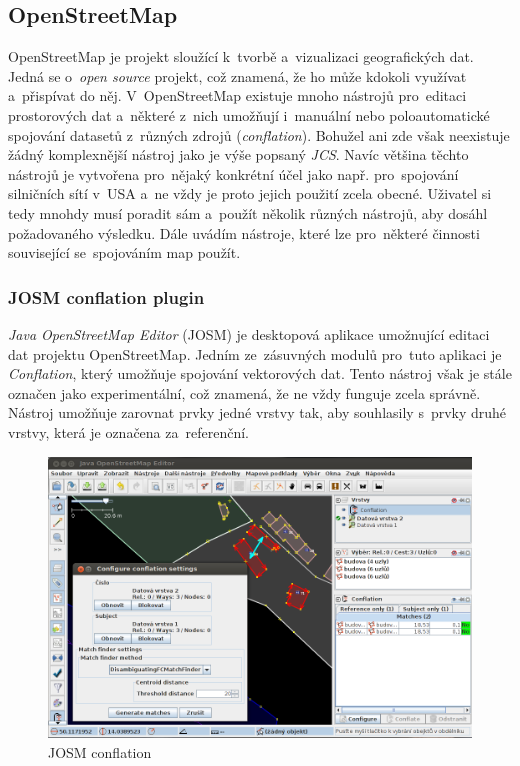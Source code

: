 
\subsection{OpenStreetMap}
\label{OSM}

OpenStreetMap je projekt sloužící k~tvorbě a~vizualizaci geografických dat.
Jedná se o~\textit{open source} projekt, což znamená, že ho může kdokoli 
využívat a~přispívat do něj. V~OpenStreetMap existuje mnoho nástrojů 
pro~editaci prostorových dat a~některé z~nich umožňují i~manuální nebo
poloautomatické spojování datasetů z~různých zdrojů (\textit{conflation}). 
Bohužel ani zde však neexistuje žádný komplexnější nástroj jako je výše
popsaný \textit{JCS}. Navíc většina těchto nástrojů je vytvořena pro~nějaký
konkrétní účel jako např. pro~spojování silničních sítí v~USA a~ne vždy
je proto jejich použití zcela obecné. Uživatel si tedy mnohdy musí poradit
sám a~použít několik různých nástrojů, aby dosáhl požadovaného výsledku.
Dále uvádím nástroje, které lze pro~některé činnosti související 
se~spojováním map použít. 

\subsubsection{JOSM conflation plugin}

\textit{Java OpenStreetMap Editor} (JOSM) je desktopová aplikace umožnující
editaci dat projektu OpenStreetMap. Jedním ze~zásuvných modulů pro~tuto 
aplikaci je \textit{Conflation}, který umožňuje spojování vektorových dat. 
Tento nástroj však je stále označen jako experimentální, což znamená, že ne 
vždy funguje zcela správně. Nástroj umožňuje zarovnat prvky jedné vrstvy tak,
aby souhlasily s~prvky druhé vrstvy, která je označena za~referenční. 

\label{josmpic}
  \begin{figure}[hbt]
    \centering
      \includegraphics[width=350pt]{./pictures/josm.png}
      \caption{JOSM conflation}
      \label{fig:josm}
  \end{figure} 

